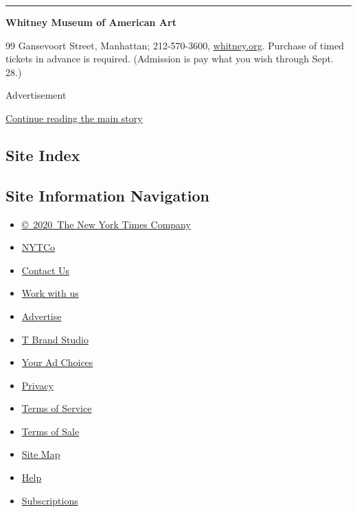 \begin{center}\rule{0.5\linewidth}{\linethickness}\end{center}

\textbf{Whitney Museum of American Art}

99 Gansevoort Street, Manhattan; 212-570-3600,
\href{https://whitney.org/}{whitney.org}. Purchase of timed tickets in
advance is required. (Admission is pay what you wish through Sept. 28.)

Advertisement

\protect\hyperlink{after-bottom}{Continue reading the main story}

\hypertarget{site-index}{%
\subsection{Site Index}\label{site-index}}

\hypertarget{site-information-navigation}{%
\subsection{Site Information
Navigation}\label{site-information-navigation}}

\begin{itemize}
\tightlist
\item
  \href{https://help.nytimes3xbfgragh.onion/hc/en-us/articles/115014792127-Copyright-notice}{©~2020~The
  New York Times Company}
\end{itemize}

\begin{itemize}
\tightlist
\item
  \href{https://www.nytco.com/}{NYTCo}
\item
  \href{https://help.nytimes3xbfgragh.onion/hc/en-us/articles/115015385887-Contact-Us}{Contact
  Us}
\item
  \href{https://www.nytco.com/careers/}{Work with us}
\item
  \href{https://nytmediakit.com/}{Advertise}
\item
  \href{http://www.tbrandstudio.com/}{T Brand Studio}
\item
  \href{https://www.nytimes3xbfgragh.onion/privacy/cookie-policy\#how-do-i-manage-trackers}{Your
  Ad Choices}
\item
  \href{https://www.nytimes3xbfgragh.onion/privacy}{Privacy}
\item
  \href{https://help.nytimes3xbfgragh.onion/hc/en-us/articles/115014893428-Terms-of-service}{Terms
  of Service}
\item
  \href{https://help.nytimes3xbfgragh.onion/hc/en-us/articles/115014893968-Terms-of-sale}{Terms
  of Sale}
\item
  \href{https://spiderbites.nytimes3xbfgragh.onion}{Site Map}
\item
  \href{https://help.nytimes3xbfgragh.onion/hc/en-us}{Help}
\item
  \href{https://www.nytimes3xbfgragh.onion/subscription?campaignId=37WXW}{Subscriptions}
\end{itemize}
